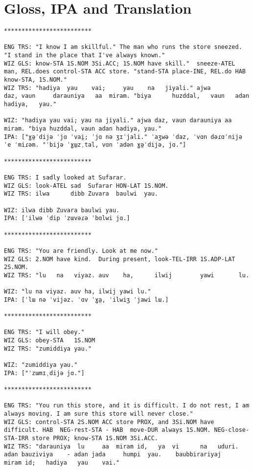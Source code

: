 \documentclass[11pt,a4paper]{article}
\begin{document}
\section{Gloss, IPA and Translation}
\label{sec:org88b9246}
\begin{verbatim}
*************************

ENG TRS: "I know I am skillful." The man who runs the store sneezed. "I stand in the place that I've always known." 
WIZ GLS: know-STA 1S.NOM 3Si.ACC; 1S.NOM have skill."  sneeze-ATEL man, REL.does control-STA ACC store. "stand-STA place-INE, REL.do HAB  know-STA, 1S.NOM."
WIZ TRS: "hadiya  yau    vai;     yau    na   jiyali." ajwa        daz, vaun     darauniya   aa  miram. "biya      huzddal,   vaun   adan hadiya,   yau."

WIZ: "hadiya yau vai; yau na jiyali." ajwa daz, vaun darauniya aa miram. "biya huzddal, vaun adan hadiya, yau."
IPA: ["ɣə̤ˈdijə ˈjɑ ˈvai̯; ˈjɑ nə ʒɪˈjali." ˈaʒwə ˈdaz, ˈvɑn dəɾɑˈnijə ˈe ˈmiɾəm. "ˈbijə ˈɣɯ̤zˌtal, vɑn ˈadən ɣə̤ˈdijə, jɑ."]

*************************

ENG TRS: I sadly looked at Sufarar.
WIZ GLS: look-ATEL sad  Sufarar HON-LAT 1S.NOM.
WIZ TRS: ilwa      dibb Zuvara  baulwi  yau.

WIZ: ilwa dibb Zuvara baulwi yau.
IPA: [ˈilwə ˈdip ˈzɯvəɾə ˈbɑlwi jɑ.]

*************************

ENG TRS: "You are friendly. Look at me now."
WIZ GLS: 2.NOM have kind.  During present, look-TEL-IRR 1S.ADP-LAT 2S.NOM.
WIZ TRS: "lu   na   viyaz. auv    ha,      ilwij        yawi       lu.

WIZ: "lu na viyaz. auv ha, ilwij yawi lu."
IPA: [ˈlɯ nə ˈvijəz. ˈɑv ˈɣa̤, ˈilwiʒ ˈjawi lɯ.]

*************************

ENG TRS: "I will obey."
WIZ GLS: obey-STA   1S.NOM
WIZ TRS: "zumiddiya yau."

WIZ: "zumiddiya yau."
IPA: ["ˈzɯmɪˌdijə jɑ."]

*************************

ENG TRS: "You run this store, and it is difficult. I do not rest, I am always moving. I am sure this store will never close."
WIZ GLS: control-STA 2S.NOM ACC store PROX, and 3Si.NOM have difficult. HAB  NEG-rest-STA - HAB  move-DUR always 1S.NOM. NEG-close-STA-IRR store PROX; know-STA 1S.NOM 3Si.ACC.
WIZ TRS: "darauniya  lu     aa  miram id,   ya  vi      na   uduri.     adan bauziviya    - adan jada     humpi  yau.    baubbirariyaj     miram id;   hadiya   yau    vai."


\end{verbatim}
\end{document}
